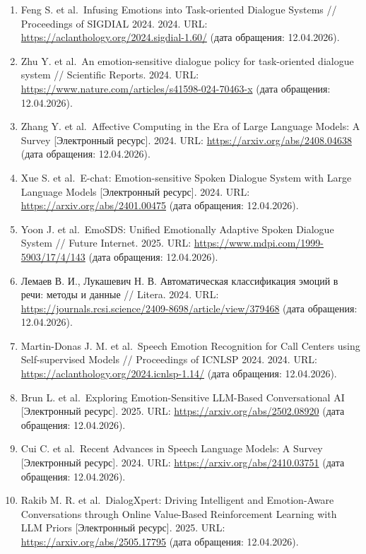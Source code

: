 \documentclass[a4paper,14pt]{extarticle}
\providecommand{\tightlist}{%
  \setlength{\itemsep}{0pt}\setlength{\parskip}{0pt}}
\begin{document}
\begin{enumerate}
\def\labelenumi{\arabic{enumi}.}
\tightlist
\item
  Feng S. et al.~Infusing Emotions into Task-oriented Dialogue Systems
  // Proceedings of SIGDIAL 2024. 2024. URL:
  \url{https://aclanthology.org/2024.sigdial-1.60/} (дата обращения:
  12.04.2026).
\item
  Zhu Y. et al.~An emotion-sensitive dialogue policy for task-oriented
  dialogue system // Scientific Reports. 2024. URL:
  \url{https://www.nature.com/articles/s41598-024-70463-x} (дата
  обращения: 12.04.2026).
\item
  Zhang Y. et al.~Affective Computing in the Era of Large Language
  Models: A Survey {[}Электронный ресурс{]}. 2024. URL:
  \url{https://arxiv.org/abs/2408.04638} (дата обращения: 12.04.2026).
\item
  Xue S. et al.~E-chat: Emotion-sensitive Spoken Dialogue System with
  Large Language Models {[}Электронный ресурс{]}. 2024. URL:
  \url{https://arxiv.org/abs/2401.00475} (дата обращения: 12.04.2026).
\item
  Yoon J. et al.~EmoSDS: Unified Emotionally Adaptive Spoken Dialogue
  System // Future Internet. 2025. URL:
  \url{https://www.mdpi.com/1999-5903/17/4/143} (дата обращения:
  12.04.2026).
\item
  Лемаев В. И., Лукашевич Н. В. Автоматическая классификация эмоций в
  речи: методы и данные // Litera. 2024. URL:
  \url{https://journals.rcsi.science/2409-8698/article/view/379468}
  (дата обращения: 12.04.2026).
\item
  Martin-Donas J. M. et al.~Speech Emotion Recognition for Call Centers
  using Self-supervised Models // Proceedings of ICNLSP 2024. 2024. URL:
  \url{https://aclanthology.org/2024.icnlsp-1.14/} (дата обращения:
  12.04.2026).
\item
  Brun L. et al.~Exploring Emotion-Sensitive LLM-Based Conversational AI
  {[}Электронный ресурс{]}. 2025. URL:
  \url{https://arxiv.org/abs/2502.08920} (дата обращения: 12.04.2026).
\item
  Cui C. et al.~Recent Advances in Speech Language Models: A Survey
  {[}Электронный ресурс{]}. 2024. URL:
  \url{https://arxiv.org/abs/2410.03751} (дата обращения: 12.04.2026).
\item
  Rakib M. R. et al.~DialogXpert: Driving Intelligent and Emotion-Aware
  Conversations through Online Value-Based Reinforcement Learning with
  LLM Priors {[}Электронный ресурс{]}. 2025. URL:
  \url{https://arxiv.org/abs/2505.17795} (дата обращения: 12.04.2026).

\end{enumerate}
\end{document}

